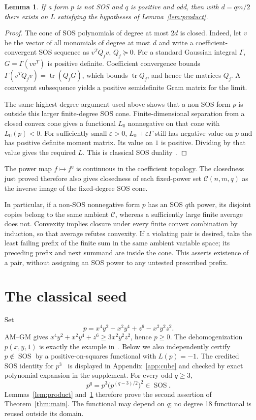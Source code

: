 \documentclass[11pt]{article}
\newtheorem{lemma}{Lemma}
\newcommand{\SOS}{\operatorname{SOS}}
\newcommand{\tr}{\operatorname{tr}}
\newcommand{\C}{\mathcal C}
\begin{document}
\begin{lemma}\label{lem:separation}
If a form $p$ is not SOS and $q$ is positive and odd, then with $d=qm/2$
there exists an $L$ satisfying the hypotheses of Lemma~\ref{lem:product}.
\end{lemma}
\begin{proof}
The cone of SOS polynomials of degree at most $2d$ is closed. Indeed, let
$v$ be the vector of all monomials of degree at most $d$ and write a
coefficient-convergent SOS sequence as $v^TQ_jv$, $Q_j\succeq0$.
For a standard Gaussian integral $\Gamma$,
$G=\Gamma(vv^T)$ is positive definite. Coefficient convergence bounds
$\Gamma(v^TQ_jv)=\tr(Q_jG)$, which bounds $\tr Q_j$, and hence the matrices
$Q_j$. A convergent subsequence yields a positive semidefinite Gram
matrix for the limit.

The same highest-degree argument used above shows that a non-SOS form
$p$ is outside this larger finite-degree SOS cone. Finite-dimensional
separation from a closed convex cone gives a functional $L_0$ nonnegative
on that cone with $L_0(p)<0$. For sufficiently small $\varepsilon>0$,
$L_0+\varepsilon\Gamma$ still has negative value on $p$ and has positive
definite moment matrix. Its value on $1$ is positive. Dividing by that
value gives the required $L$. This is classical SOS duality~\cite{BCJ}.
\end{proof}

The power map $f\mapsto f^q$ is continuous in the coefficient topology.
The closedness just proved therefore also gives closedness of each fixed-power
set $\C(n,m,q)$ as the inverse image of the fixed-degree SOS cone.

In particular, if a non-SOS nonnegative form $p$ has an SOS $q$th power,
its disjoint copies belong to the same ambient $\C$, whereas a sufficiently
large finite average does not. Convexity implies closure under every
finite convex combination by induction, so that average refutes convexity.
If a violating pair is desired, take the least failing prefix of the
finite sum in the same ambient variable space; its preceding prefix and
next summand are inside the cone. This asserts existence of a pair,
without assigning an SOS power to any untested prescribed prefix.

\section{The classical seed}
Set
\begin{equation}\label{eq:seed}
 p=x^4y^2+x^2y^4+z^6-x^2y^2z^2.
\end{equation}
AM--GM gives $x^4y^2+x^2y^4+z^6\ge3x^2y^2z^2$, hence $p\ge0$.
The dehomogenization $p(x,y,1)$ is exactly the example in~\cite[Lemma~1]{BCJ}.
Below we also independently certify $p\notin\SOS$ by a positive-on-squares
functional with $L(p)=-1$.
The credited SOS identity for $p^3$~\cite{OWR,BKR} is displayed in
Appendix~\ref{app:cube} and checked by exact polynomial expansion in the
supplement. For every odd $q\ge3$,
\[
                 p^q=p^3\bigl(p^{(q-3)/2}\bigr)^2\in\SOS.
\]
Lemmas~\ref{lem:product} and~\ref{lem:separation} therefore prove the second
assertion of Theorem~\ref{thm:main}. The functional may depend on $q$;
no degree 18 functional is reused outside its domain.
\end{document}
